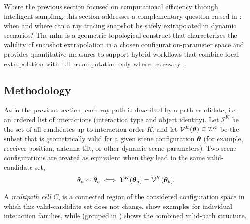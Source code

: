 Where the previous section focused on computational efficiency through intelligent sampling, this section addresses a complementary question raised in : when and where can a ray tracing snapshot be safely extrapolated in dynamic scenarios? The \gls{mlm} is a geometric-topological construct that characterizes the validity of snapshot extrapolation in a chosen configuration-parameter space and provides quantitative measures to support hybrid workflows that combine local extrapolation with full recomputation only where necessary~.

\subsection{Methodology}

As in the previous section, each ray path is described by a path candidate, i.e., an ordered list of interactions (interaction type and object identity). Let $\mathcal{I}^K$ be the set of all candidates up to interaction order $K$, and let $\mathcal{V}^K(\boldsymbol{\theta})\subseteq\mathcal{I}^K$ be the subset that is geometrically valid for a given scene configuration $\boldsymbol{\theta}$ (for example, receiver position, antenna tilt, or other dynamic scene parameters). Two scene configurations are treated as equivalent when they lead to the same valid-candidate set,
\begin{equation}
  \boldsymbol{\theta}_a \sim \boldsymbol{\theta}_b \iff \mathcal{V}^K(\boldsymbol{\theta}_a)=\mathcal{V}^K(\boldsymbol{\theta}_b).
\end{equation}

A \emph{multipath cell} $C_i$ is a connected region of the considered configuration space in which this valid-candidate set does not change.  show examples for individual interaction families, while  (grouped in ) shows the combined valid-path structure.

